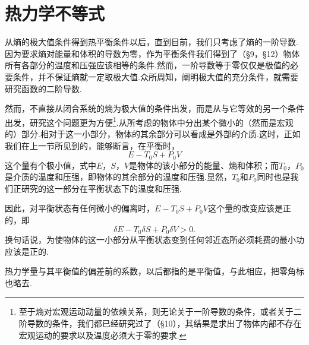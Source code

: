\section{热力学不等式}

从熵的极大值条件得到热平衡条件以后，直到目前，我们只考虑了熵的一阶导数.因为要求熵对能量和体积的导数为零，作为平衡条件我们得到了（§9，§12）物体所有各部分的温度和压强应该相等的条件.然而，一阶导数等于零仅仅是极值的必要条件，并不保证熵就一定取极大值.众所周知，阐明极大值的充分条件，就需要研究函数的二阶导数.

然而，不直接从闭合系统的熵为极大值的条件出发，而是从与它等效的另一个条件出发，研究这个问题更为方便\footnote{至于熵对宏观运动动量的依赖关系，则无论关于一阶导数的条件，或者关于二阶导数的条件，我们都已经研究过了（§10），其结果是求出了物体内部不存在宏观运动的要求以及温度必须大于零的要求.}.从所考虑的物体中分出某个微小的（然而是宏观的）部分.相对于这一小部分，物体的其余部分可以看成是外部的介质.这时，正如我们在上一节所见到的，能够断言，在平衡时，
\begin{equation*}
  E-T_0S+P_0V
\end{equation*}
这个量有个极小值，式中$E$，$S$，$V$是物体的该小部分的能量、熵和体积；而$T_0$，$P_0$是介质的温度和压强，即物体的其余部分的温度和压强.显然，$T_0$和$P_0$同时也是我们正研究的这一部分在平衡状态下的温度和压强.

因此，对平衡状态有任何微小的偏离时，$E-T_0S+P_0V$这个量的改变应该是正的，即
\begin{equation}
  \delta E-T_0\delta S+P_0\delta V>0.
\end{equation}
换句话说，为使物体的这一小部分从平衡状态变到任何邻近态所必须耗费的最小功应该是正的.

热力学量与其平衡值的偏差前的系数，以后都指的是平衡值，与此相应，把零角标也略去.

